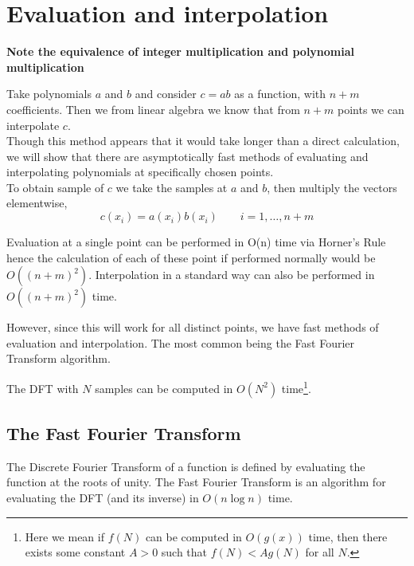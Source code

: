 
\chapter{Evaluation and interpolation}\label{chapter2}

\textbf{Note the equivalence of integer multiplication and polynomial multiplication}

Take polynomials $a$ and $b$ and consider $c = ab$ as a function, with $n + m$ coefficients. Then we from linear algebra we know that from $n + m$ points we can interpolate $c$.\\
Though this method appears that it would take longer than a direct calculation, we will show that there are asymptotically fast methods of evaluating and interpolating polynomials at specifically chosen points.\\

To obtain sample of $c$ we take the samples at $a$ and $b$, then multiply the vectors elementwise,
\[
  c(x_i) = a(x_i)b(x_i) \qquad i = 1, \ldots, n + m
\]

Evaluation at a single point can be performed in O(n) time via Horner's Rule hence the calculation of each of these point if performed normally would be $O((n + m)^2)$. Interpolation in a standard way can also be performed in $O((n+m)^2)$ time.

However, since this will work for all distinct points, we have fast methods of evaluation and interpolation. The most common being the Fast Fourier Transform algorithm.

\begin{theorem}
The DFT with $N$ samples can be computed in $O(N^2)$ time\footnote{Here we mean if $f(N)$ can be computed in $O(g(x))$ time, then there exists some constant $A > 0$ such that $f(N) < Ag(N)$ for all $N$.}. 
\end{theorem}

\section{The Fast Fourier Transform}

The Discrete Fourier Transform of a function is defined by evaluating the function at the roots of unity. The Fast Fourier Transform is an algorithm for evaluating the DFT (and its inverse) in $O(n \log n)$ time.



